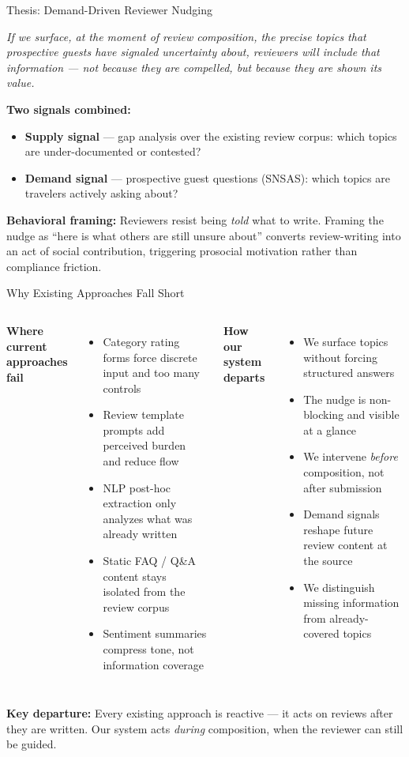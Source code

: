 \documentclass[aspectratio=169,10pt]{beamer}
\begin{document}
\begin{frame}{Thesis: Demand-Driven Reviewer Nudging}

\textit{If we surface, at the moment of review composition, the precise topics
that prospective guests have signaled uncertainty about, reviewers will include
that information — not because they are compelled, but because they are shown
its value.}

\bigskip
\textbf{Two signals combined:}
\begin{itemize}
  \item \textbf{Supply signal} — gap analysis over the existing review corpus:
        which topics are under-documented or contested?
  \item \textbf{Demand signal} — prospective guest questions (SNSAS):
        which topics are travelers actively asking about?
\end{itemize}

\bigskip
\textbf{Behavioral framing:}
Reviewers resist being \textit{told} what to write.
Framing the nudge as ``here is what others are still unsure about'' converts
review-writing into an act of social contribution, triggering prosocial
motivation rather than compliance friction.
\end{frame}


\begin{frame}{Why Existing Approaches Fall Short}
\begin{columns}[T]
\textbf{Where current approaches fail}
\begin{itemize}
  \item Category rating forms force discrete input and too many controls
  \item Review template prompts add perceived burden and reduce flow
  \item NLP post-hoc extraction only analyzes what was already written
  \item Static FAQ / Q\&A content stays isolated from the review corpus
  \item Sentiment summaries compress tone, not information coverage
\end{itemize}

\textbf{How our system departs}
\begin{itemize}
  \item We surface topics without forcing structured answers
  \item The nudge is non-blocking and visible at a glance
  \item We intervene \textit{before} composition, not after submission
  \item Demand signals reshape future review content at the source
  \item We distinguish missing information from already-covered topics
\end{itemize}
\end{columns}

\medskip
\textbf{Key departure:} Every existing approach is reactive — it acts on reviews
after they are written. Our system acts \textit{during} composition, when the
reviewer can still be guided.
\end{frame}
\end{document}
